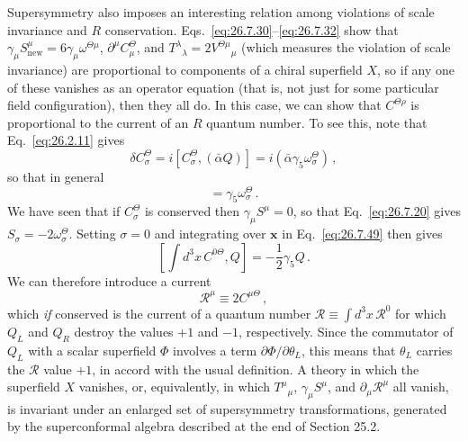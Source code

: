 Supersymmetry also imposes an interesting relation among violations of scale
invariance and \(R\) conservation. Eqs.~\eqref{eq:26.7.30}--\eqref{eq:26.7.32}
show that \(\gamma_\mu S_{\mathrm{new}}^\mu
=6\gamma_\mu\omega^{\Theta\mu}\), \(\partial^\mu C_\mu^\Theta\), and
\(T^\lambda{}_\lambda=2V^{\Theta\mu}{}_\mu\) (which measures the violation
of scale invariance) are proportional to components of a chiral superfield
\(X\), so if any one of these vanishes as an operator equation (that is, not
just for some particular field configuration), then they all do. In this
case, we can show that \(C^{\Theta\rho}\) is proportional to the current of
an \(R\) quantum number. To see this, note that Eq.~\eqref{eq:26.2.11} gives
\[
  \delta C_\sigma^\Theta
  =i[C_\sigma^\Theta,(\bar\alpha Q)]
  =i(\bar\alpha\gamma_5\omega_\sigma^\Theta)\,,
\]
so that in general
\begin{equation}
  [C_\sigma^\Theta,Q]=\gamma_5\omega_\sigma^\Theta\,.
  \tag{26.7.49}\label{eq:26.7.49}
\end{equation}
We have seen that if \(C_\sigma^\Theta\) is conserved then
\(\gamma_\mu S^\mu=0\), so that Eq.~\eqref{eq:26.7.20} gives
\(S_\sigma=-2\omega_\sigma^\Theta\). Setting \(\sigma=0\) and integrating
over \(\mathbf{x}\) in Eq.~\eqref{eq:26.7.49} then gives
\begin{equation}
  \left[
    \int d^3x\,C^{0\Theta},Q
  \right]
  =-\frac12\gamma_5Q\,.
  \tag{26.7.50}\label{eq:26.7.50}
\end{equation}
We can therefore introduce a current
\begin{equation}
  \mathcal{R}^\mu\equiv2C^{\mu\Theta}\,,
  \tag{26.7.51}\label{eq:26.7.51}
\end{equation}
which \emph{if} conserved is the current of a quantum number
\(\mathcal{R}\equiv\int d^3x\,\mathcal{R}^0\) for which \(Q_L\) and \(Q_R\)
destroy the values \(+1\) and \(-1\), respectively. Since the commutator of
\(Q_L\) with a scalar superfield \(\Phi\) involves a term
\(\partial\Phi/\partial\theta_L\), this means that \(\theta_L\) carries the
\(\mathcal{R}\) value \(+1\), in accord with the usual definition. A theory
in which the superfield \(X\) vanishes, or, equivalently, in which
\(T^\mu{}_\mu\), \(\gamma_\mu S^\mu\), and \(\partial_\mu\mathcal{R}^\mu\)
all vanish, is invariant under an enlarged set of supersymmetry
transformations, generated by the superconformal algebra described at the
end of Section 25.2.

